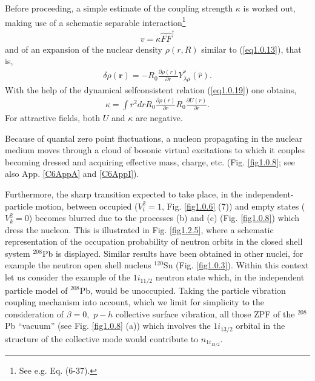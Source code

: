 Before proceeding, a simple estimate of the coupling strength $\kappa$ is worked out, making use of a schematic separable interaction\footnote{See e.g. \cite{Bohr:75} Eq. (6-37).}
\begin{align}\label{eq1.2.9}
v=\kappa\hat F\hat F^\dagger
\end{align}
and of an expansion of the nuclear density $\rho(r,R)$ similar to (\ref{eq1.0.13}), that is,
\begin{align}\label{eq1.2.10}
\delta\rho(\mathbf r)=-R_0\frac{\partial\rho(r)}{\partial r} Y^*_{\lambda\mu}(\hat r).
\end{align}
With the help of the dynamical selfconsistent relation (\ref{eq1.0.19}) one obtains,
\begin{align}\label{eq1.2.11}
\kappa=\int r^2 dr R_0\frac{\partial\rho(r)}{\partial r}R_0\frac{\partial U(r)}{\partial r}.
\end{align}
For attractive fields, both $U$ and $\kappa$ are negative.


Because of quantal zero point fluctuations, a nucleon propagating in the nuclear medium moves through a cloud of bosonic  virtual excitations to which it couples becoming dressed and acquiring  effective mass, charge, etc. (Fig. \ref{fig1.0.8}; see also App. \ref{C6AppA} and \ref{C6AppI}). 


Furthermore, the sharp transition expected to take place, in the independent-particle motion, between occupied ($V^2_i=1$, Fig. \ref{fig1.0.6} (7)) and empty states ($V^2_k=0$) becomes blurred due to the processes (b) and (c) (Fig. \ref{fig1.0.8}) which dress the nucleon. This is illustrated in Fig. \ref{fig1.2.5}, where a schematic representation of the occupation probability of neutron orbits in the closed shell system $^{208}$Pb is displayed. Similar results have been obtained in other nuclei, for example the neutron open shell nucleus $^{120}$Sn (Fig. \ref{fig1.0.3}). Within this context let us consider the example of the $1i_{11/2}$ neutron state which, in the independent particle model of $^{208}$Pb, would be unoccupied. Taking the particle vibration coupling mechanism into account, which we limit for simplicity to the consideration of $\beta=0,$ $p-h$ collective surface vibration, all those ZPF of the $^{208}$Pb ``vacuum'' (see Fig. \ref{fig1.0.8} (a)) which involves the $1i_{13/2}$ orbital in the structure of the collective mode would contribute to $n_{1i_{13/2}}$.

